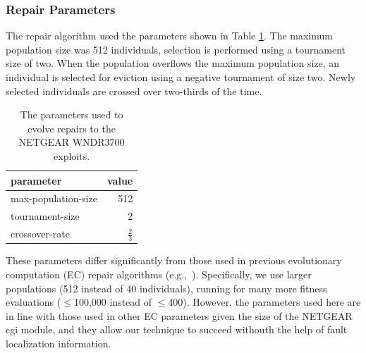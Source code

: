 \documentclass{sigcomm-alternate}
\begin{document}
{\subsubsection{Repair Parameters}
\label{sec:parameters}
The repair algorithm used the parameters shown in Table \ref{parameters}.  The
maximum population size was 512 individuals, selection is performed
using a tournament size of two.  
When the population overflows the
maximum population size, an individual is selected for eviction using
a negative tournament of size two.  Newly selected individuals are
crossed over two-thirds of the time.

\begin{table}[htb]
\centering
\begin{tabular}{lr}
parameter           & value         \\
\hline
max-population-size & 512           \\
tournament-size     & 2             \\
crossover-rate      & $\frac{2}{3}$ \\
\end{tabular}\caption{\label{parameters}The parameters used to evolve repairs to the NETGEAR WNDR3700 exploits.}

\end{table}

These parameters differ significantly from those used in previous
evolutionary computation (EC)
repair algorithms
(e.g.,~\cite{forrest2009genetic,legoues2011systematicstudy,le2012representations}).
Specifically, we use larger populations (512 instead of 40 individuals),
running for many more fitness evaluations ($\leq$100,000 instead of
$\leq$400).  However, the parameters used here are in line with
those used in other EC parameters given the size of the NETGEAR cgi
module, and they
allow our technique to succeed withouth the help of fault localization
information.

}
\end{document}
